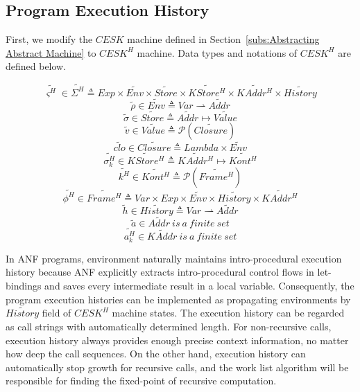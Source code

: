 \documentclass{article}
\begin{document}
\subsection{Program Execution History}
\label{sub:Program Execution History}
First, we modify the $CESK$ machine defined in Section~\ref{subs:Abstracting Abstract Machine} to $CESK^H$ machine.
Data types and notations of $CESK^H$ are defined below.

\[
\tag{states}
\widetilde{\varsigma^H}\in\widetilde{\Sigma^H} \triangleq Exp \times \widetilde{Env} \times \widetilde{Store}
\times \widetilde{KStore^H} \times \widetilde{KAddr^H} \times \widetilde{History}
\]
\[
\tag{environments}
\widetilde{\rho} \in \widetilde{Env} \triangleq Var \rightharpoonup \widetilde{Addr}
\]
\[
\tag{srores}
\widetilde{\sigma} \in \widetilde{Store} \triangleq \widetilde{Addr} \mapsto \widetilde{Value}
\]
\[
\tag{abstract values}
\widetilde{v} \in \widetilde{Value} \triangleq \mathcal{P}(\widetilde{Closure})
\]
\[
\tag{closures}
\widetilde{clo} \in \widetilde{Closure} \triangleq Lambda \times \widetilde{Env}
\]
\[
\tag{continuation stores}
\widetilde{\sigma_k^H} \in \widetilde{KStore^H} \triangleq  \widetilde{KAddr^H} \mapsto  \widetilde{Kont^H}
\]
\[
\tag{abstract continuations}
\widetilde{k^H} \in  \widetilde{Kont^H} \triangleq  \mathcal{P}(\widetilde{Frame^H})
\]
\[
\tag{stack frames}
\widetilde{\phi^H} \in  \widetilde{Frame^H} \triangleq Var \times Exp \times  \widetilde{Env} \times \widetilde{History} \times  \widetilde{KAddr^H}
\]
\[
\tag{histories}
\widetilde{h} \in \widetilde{History} \triangleq Var \rightharpoonup \widetilde{Addr}
\]
\[
\tag{value addresses}
\widetilde{a} \in \widetilde{Addr} \ is\ a\ finite\ set
\]
\[
\tag{continuation addresses}
\widetilde{a_k^H} \in \widetilde{KAddr} \ is\ a\ finite\ set
\]

In ANF programs, environment naturally maintains intro-procedural execution history because ANF explicitly extracts intro-procedural control flows in let-bindings and saves every intermediate result in a local variable.
Consequently, the program execution histories can be implemented as propagating environments by $\widetilde{History}$ field of $CESK^H$ machine states.
The execution history can be regarded as call strings with automatically determined length. For non-recursive calls, execution history always provides enough precise context information, no matter how deep the call sequences. On the other hand, execution history can automatically stop growth for recursive calls, and the work list algorithm will be responsible for finding the fixed-point of recursive computation.
\end{document}
